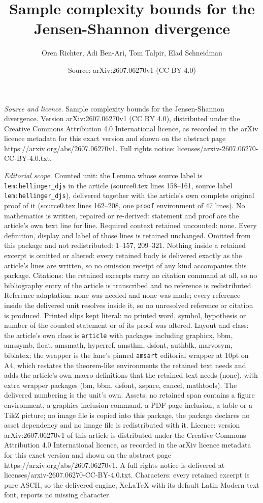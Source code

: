 \documentclass[10pt,a4paper]{amsart}
\title[Sample complexity bounds for the Jensen-Shannon divergence]{Sample complexity bounds for the Jensen-Shannon divergence}
\author{Oren Richter, Adi Ben-Ari, Tom Talpir, Elad Schneidman}
\date{Source: arXiv:2607.06270v1 (CC BY 4.0)}
\begin{document}
\maketitle

\noindent\emph{Source and licence.} Sample complexity bounds for the Jensen-Shannon divergence. Version arXiv:2607.06270v1 (CC BY 4.0), distributed under the Creative Commons Attribution 4.0 International licence, as recorded in the arXiv licence metadata for this exact version and shown on the abstract page https://arxiv.org/abs/2607.06270v1. Full rights notice: licenses/arxiv-2607.06270-CC-BY-4.0.txt.\par\smallskip

\noindent\textit{Editorial scope.} Counted unit: the Lemma whose source label is \texttt{lem:hellinger\_djs} in the article (source0.tex lines 158--161, source label \texttt{lem:hellinger\_djs}), delivered together with the article's own complete original proof of it (source0.tex lines 162--208, one \texttt{proof} environment of 47 lines). No mathematics is written, repaired or re-derived: statement and proof are the article's own text line for line. Required context retained uncounted: none. Every definition, display and label of those lines is retained unchanged. Omitted from this package and not redistributed: 1--157, 209--321. Nothing inside a retained excerpt is omitted or altered: every retained body is delivered exactly as the article's lines are written, so no omission receipt of any kind accompanies this package. Citations: the retained excerpts carry no citation command at all, so no bibliography entry of the article is transcribed and no reference is redistributed. Reference adaptation: none was needed and none was made; every reference inside the delivered unit resolves inside it, so no unresolved reference or citation is produced. Printed slips kept literal: no printed word, symbol, hypothesis or number of the counted statement or of its proof was altered. Layout and class: the article's own class is \texttt{article} with packages including graphicx, bbm, amssymb, float, amsmath, hyperref, amsthm, dsfont, authblk, marvosym, biblatex; the wrapper is the lane's pinned \texttt{amsart} editorial wrapper at 10pt on A4, which restates the theorem-like environments the retained text needs and adds the article's own macro definitions that the retained text needs (none), with extra wrapper packages (bm, bbm, dsfont, xspace, cancel, mathtools). The delivered numbering is the unit's own. Assets: no retained span contains a figure environment, a graphics-inclusion command, a PDF-page inclusion, a table or a TikZ picture; no image file is copied into this package, the package declares no asset dependency and no image file is redistributed with it. Licence: version arXiv:2607.06270v1 of this article is distributed under the Creative Commons Attribution 4.0 International licence, as recorded in the arXiv licence metadata for this exact version and shown on the abstract page https://arxiv.org/abs/2607.06270v1. A full rights notice is delivered at licenses/arxiv-2607.06270-CC-BY-4.0.txt. Characters: every retained excerpt is pure ASCII, so the delivered engine, XeLaTeX with its default Latin Modern text font, reports no missing character.
\end{document}
